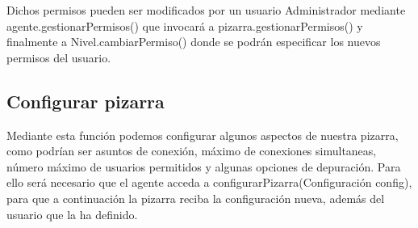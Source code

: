 Dichos permisos pueden ser modificados por un usuario Administrador mediante agente.gestionarPermisos() que invocará a pizarra.gestionarPermisos() y finalmente a Nivel.cambiarPermiso() donde se podrán especificar los nuevos permisos del usuario.
\subsection{Configurar pizarra}
Mediante esta función podemos configurar algunos aspectos de nuestra pizarra, como podrían ser asuntos de conexión, máximo de conexiones simultaneas, número máximo de usuarios permitidos y algunas opciones de depuración. Para ello será necesario que el agente acceda a configurarPizarra(Configuración config), para que a continuación la pizarra reciba la configuración nueva, además del usuario que la ha definido.

